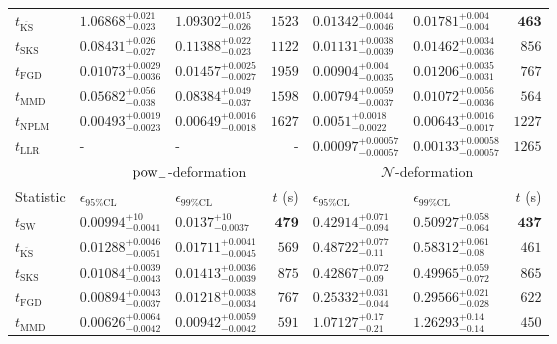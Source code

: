 \begin{tabular}{l|llr|llr}
	$t_{\overline{\mathrm{KS}}}$ & $1.06868_{-0.023}^{+0.021}$ & $1.09302_{-0.026}^{+0.015}$ & $1523$ & $0.01342_{-0.0046}^{+0.0044}$ & $0.01781_{-0.004}^{+0.004}$ & ${\mathbf{463}}$ \\
	$t_{\mathrm{SKS}}$ & $0.08431_{-0.027}^{+0.026}$ & $0.11388_{-0.023}^{+0.022}$ & $1122$ & $0.01131_{-0.0039}^{+0.0038}$ & $0.01462_{-0.0036}^{+0.0034}$ & $856$ \\
	$t_{\mathrm{FGD}}$ & ${\mathbf{0.01073_{-0.0036}^{+0.0029}}}$ & ${\mathbf{0.01457_{-0.0027}^{+0.0025}}}$ & $1959$ & $0.00904_{-0.0035}^{+0.004}$ & $0.01206_{-0.0031}^{+0.0035}$ & $767$ \\
	$t_{\mathrm{MMD}}$ & $0.05682_{-0.038}^{+0.056}$ & $0.08384_{-0.037}^{+0.049}$ & $1598$ & ${\mathbf{0.00794_{-0.0037}^{+0.0059}}}$ & ${\mathbf{0.01072_{-0.0036}^{+0.0056}}}$ & $564$ \\
\rowcolor{red!35}	$t_{\mathrm{NPLM}}$ & $0.00493_{-0.0023}^{+0.0019}$ & $0.00649_{-0.0018}^{+0.0016}$ & $1627$ & $0.0051_{-0.0022}^{+0.0018}$ & $0.00643_{-0.0017}^{+0.0016}$ & $1227$ \\
	$t_{\mathrm{LLR}}$ & - & - & - & $0.00097_{-0.00057}^{+0.00057}$ & $0.00133_{-0.00057}^{+0.00058}$ & $1265$ \\
	\toprule
	\multicolumn{1}{c}{} & \multicolumn{3}{c}{$\rm{pow}_{-}$-deformation} & \multicolumn{3}{c}{$\mathcal{N}$-deformation} \\
	Statistic & $\epsilon_{95\%\mathrm{CL}}$ & $\epsilon_{99\%\mathrm{CL}}$ & $t$ (s) & $\epsilon_{95\%\mathrm{CL}}$ & $\epsilon_{99\%\mathrm{CL}}$ & $t$ (s) \\
	\midrule
	$t_{\mathrm{SW}}$ & $0.00994_{-0.0041}^{+10}$ & $0.0137_{-0.0037}^{+10}$ & ${\mathbf{479}}$ & $0.42914_{-0.094}^{+0.071}$ & $0.50927_{-0.064}^{+0.058}$ & ${\mathbf{437}}$ \\
	$t_{\overline{\mathrm{KS}}}$ & $0.01288_{-0.0051}^{+0.0046}$ & $0.01711_{-0.0045}^{+0.0041}$ & $569$ & $0.48722_{-0.11}^{+0.077}$ & $0.58312_{-0.08}^{+0.061}$ & $461$ \\
	$t_{\mathrm{SKS}}$ & $0.01084_{-0.0043}^{+0.0039}$ & $0.01413_{-0.0039}^{+0.0036}$ & $875$ & $0.42867_{-0.09}^{+0.072}$ & $0.49965_{-0.072}^{+0.059}$ & $865$ \\
	$t_{\mathrm{FGD}}$ & $0.00894_{-0.0037}^{+0.0043}$ & $0.01218_{-0.0034}^{+0.0038}$ & $767$ & ${\mathbf{0.25332_{-0.044}^{+0.031}}}$ & ${\mathbf{0.29566_{-0.028}^{+0.021}}}$ & $622$ \\
	$t_{\mathrm{MMD}}$ & ${\mathbf{0.00626_{-0.0042}^{+0.0064}}}$ & ${\mathbf{0.00942_{-0.0042}^{+0.0059}}}$ & $591$ & $1.07127_{-0.21}^{+0.17}$ & $1.26293_{-0.14}^{+0.14}$ & $450$ \\

\end{tabular}
